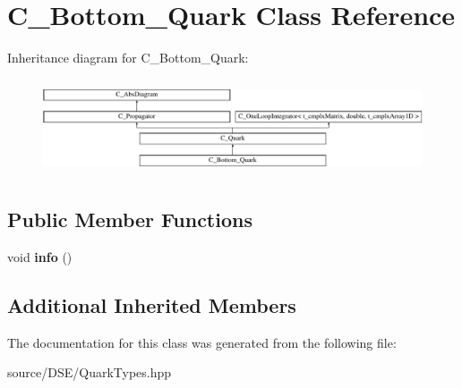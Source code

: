 \hypertarget{class_c___bottom___quark}{\section{C\-\_\-\-Bottom\-\_\-\-Quark Class Reference}
\label{class_c___bottom___quark}
}
Inheritance diagram for C\-\_\-\-Bottom\-\_\-\-Quark\-:\begin{figure}[H]
\begin{center}
\leavevmode
\includegraphics[height=2.871795cm]{class_c___bottom___quark}
\end{center}
\end{figure}
\subsection*{Public Member Functions}
\begin{DoxyCompactItemize}
\item 
\hypertarget{class_c___bottom___quark_a85bf3405a3e4d7e5916a64b996ab621e}{void {\bfseries info} ()}\label{class_c___bottom___quark_a85bf3405a3e4d7e5916a64b996ab621e}

\end{DoxyCompactItemize}
\subsection*{Additional Inherited Members}


The documentation for this class was generated from the following file\-:\begin{DoxyCompactItemize}
\item 
source/\-D\-S\-E/Quark\-Types.\-hpp\end{DoxyCompactItemize}
